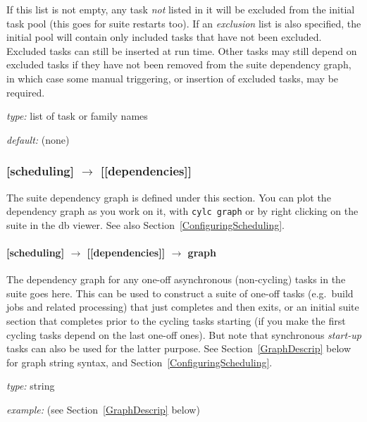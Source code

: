 If this list is not empty, any task {\em not} listed in it will be
excluded from the initial task pool (this goes for suite restarts too).
If an {\em exclusion} list is also specified, the initial pool will
contain only included tasks that have not been excluded. Excluded tasks
can still be inserted at run time. Other tasks may still depend on
excluded tasks if they have not been removed from the suite dependency
graph, in which case some manual triggering, or insertion of excluded
tasks, may be required.

\begin{myitemize}
    \item {\em type:} list of task or family names
    \item {\em default:} (none)
\end{myitemize}

\subsubsection[{[[}dependencies{]]}]{[scheduling] $\rightarrow$ [[dependencies]]}

The suite dependency graph is defined under this section.  You can plot
the dependency graph as you work on it, with \lstinline=cylc graph= or
by right clicking on the suite in the db viewer.  See also
Section~\ref{ConfiguringScheduling}.

\paragraph[graph]{ [scheduling] $\rightarrow$ [[dependencies]] $\rightarrow$ graph }

The dependency graph for any one-off asynchronous (non-cycling) tasks in
the suite goes here. This can be used to construct a suite of one-off
tasks (e.g.\ build jobs and related processing) that just completes and
then exits, or an initial suite section that completes prior to the
cycling tasks starting (if you make the first cycling tasks depend on
the last one-off ones). But note that synchronous {\em start-up} tasks
can also be used for the latter purpose.  See Section~\ref{GraphDescrip}
below for graph string syntax, and Section~\ref{ConfiguringScheduling}.
\begin{myitemize}
    \item {\em type:} string
    \item {\em example:} (see Section~\ref{GraphDescrip} below)
\end{myitemize}

